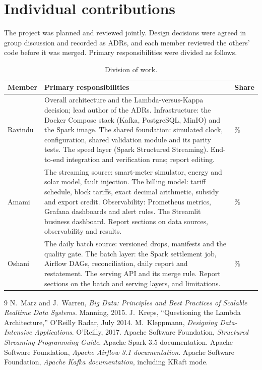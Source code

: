 \documentclass[11pt,a4paper]{article}
\begin{document}
\section{Individual contributions}
\label{sec:contrib}

The project was planned and reviewed jointly. Design decisions were agreed in group
discussion and recorded as ADRs, and each member reviewed the others' code before it
was merged. Primary responsibilities were divided as follows.

\begin{table}[!htbp]
\centering\small
\caption{Division of work.}
\label{tab:contrib}
\begin{tabularx}{\linewidth}{@{}>{\raggedright\arraybackslash}p{1.6cm}>{\raggedright\arraybackslash}X>{\centering\arraybackslash}p{1.35cm}@{}}
\toprule
\textbf{Member} & \textbf{Primary responsibilities} & \textbf{Share} \\
\midrule
Ravindu & Overall architecture and the Lambda-versus-Kappa decision; lead author of the ADRs.
Infrastructure: the Docker Compose stack (Kafka, PostgreSQL, MinIO) and the Spark image.
The shared foundation: simulated clock, configuration, shared validation module and its
parity tests. The speed layer (Spark Structured Streaming). End-to-end integration and
verification runs; report editing. & 36\% \\
\addlinespace
Amami & The streaming source: smart-meter simulator, energy and solar model, fault
injection. The billing model: tariff schedule, block tariffs, exact decimal arithmetic,
subsidy and export credit. Observability: Prometheus metrics, Grafana dashboards and
alert rules. The Streamlit business dashboard. Report sections on data sources,
observability and results. & 32\% \\
\addlinespace
Oshani & The daily batch source: versioned drops, manifests and the quality gate. The batch
layer: the Spark settlement job, Airflow DAGs, reconciliation, daily report and
restatement. The serving API and its merge rule. Report sections on the batch and
serving layers, and limitations. & 32\% \\
\bottomrule
\end{tabularx}
\end{table}

\begin{thebibliography}{9}
\small
\setlength{\itemsep}{1pt}
 N.~Marz and J.~Warren, \emph{Big Data: Principles and Best Practices of Scalable Realtime Data Systems}. Manning, 2015.
 J.~Kreps, ``Questioning the Lambda Architecture,'' O'Reilly Radar, July 2014.
 M.~Kleppmann, \emph{Designing Data-Intensive Applications}. O'Reilly, 2017.
 Apache Software Foundation, \emph{Structured Streaming Programming Guide}, Apache Spark 3.5 documentation.
 Apache Software Foundation, \emph{Apache Airflow 3.1 documentation}.
 Apache Software Foundation, \emph{Apache Kafka documentation}, including KRaft mode.
\end{thebibliography}
\end{document}
